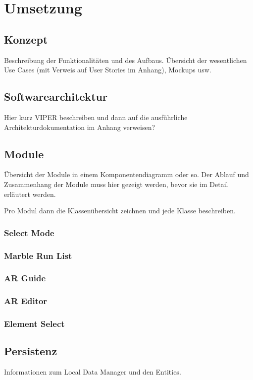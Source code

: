 \section{Umsetzung}


\subsection{Konzept}

Beschreibung der Funktionalitäten und des Aufbaus. Übersicht der wesentlichen Use Cases (mit Verweis auf User Stories im Anhang), Mockups usw.

\subsection{Softwarearchitektur}

Hier kurz VIPER beschreiben und dann auf die ausführliche Architekturdokumentation im Anhang verweisen?

\subsection{Module}

Übersicht der Module in einem Komponentendiagramm oder so.
Der Ablauf und Zusammenhang der Module muss hier gezeigt werden, bevor sie im Detail erläutert werden.

Pro Modul dann die Klassenübersicht zeichnen und jede Klasse beschreiben.

\subsubsection{Select Mode}

\subsubsection{Marble Run List}

\subsubsection{AR Guide}

\subsubsection{AR Editor}

\subsubsection{Element Select}


\subsection{Persistenz}

Informationen zum Local Data Manager und den Entities.
